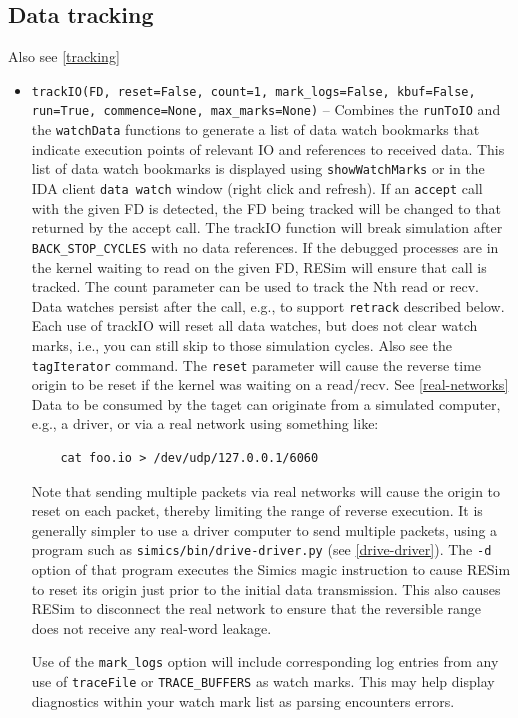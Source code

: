\documentclass[titlepage]{article}
\begin{document}
\subsection{Data tracking}
Also see \ref{tracking}
\begin{itemize}

\item {\tt trackIO(FD, reset=False, count=1, mark\_logs=False, kbuf=False, run=True, commence=None, max\_marks=None)} -- Combines the {\tt runToIO} and the {\tt watchData} functions to generate a list of data watch bookmarks that indicate execution
points of relevant IO and references to received data.  This list of data watch bookmarks is displayed using {\tt showWatchMarks} or in the IDA client {\tt data watch} window (right click and refresh).
If an {\tt accept} call with the given FD is detected, the FD being tracked will be changed to that returned by the accept call.
The trackIO function will break simulation after {\tt BACK\_STOP\_CYCLES} with no data references. If the debugged processes are in the kernel waiting to read on the given
FD, RESim will ensure that call is tracked.  The count parameter can be used to track the Nth read or recv.   Data watches persist after the
call, e.g., to support {\tt retrack} described below.  Each use of trackIO will reset all data watches, but does not clear watch marks, i.e., you can still skip to those simulation cycles.  Also see 
the {\tt tagIterator} command.  The {\tt reset} parameter will cause the reverse time origin to be reset if the kernel was waiting on a read/recv. See \ref{real-networks}  Data to be consumed by the taget can originate from a simulated computer, e.g., a driver, or via a real network using something like:
\begin{verbatim}
    cat foo.io > /dev/udp/127.0.0.1/6060 
\end{verbatim}
\noindent Note that sending multiple packets via real networks will cause the origin to reset on each packet, thereby limiting the range of reverse execution.  It is generally simpler
to use a driver computer to send multiple packets, using a program such as {\tt simics/bin/drive-driver.py} (see \ref{drive-driver}).  The {\tt -d} option of that program executes the Simics magic instruction to cause RESim to reset
its origin just prior to the initial data transmission.  This also causes RESim to disconnect the real network to ensure that the reversible range does not receive any real-word leakage.

Use of the {\tt mark\_logs} option will include corresponding log entries from any use of {\tt traceFile} or {\tt TRACE\_BUFFERS} as watch marks.  This may help display diagnostics
within your watch mark list as parsing encounters errors.


\end{itemize}
\end{document}
